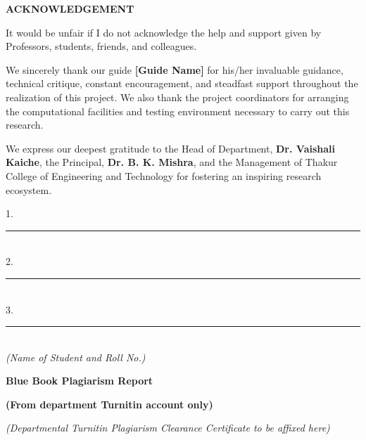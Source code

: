 \documentclass[12pt,a4paper]{report}
\begin{document}
\newpage
\thispagestyle{empty}
\begin{center}
{\fontsize{16}{20}\selectfont \textbf{ACKNOWLEDGEMENT}\par}
\end{center}

\vspace{0.8cm}
\noindent It would be unfair if I do not acknowledge the help and support given by Professors, students, friends, and colleagues.

\noindent We sincerely thank our guide \textbf{[Guide Name]} for his/her invaluable guidance, technical critique, constant encouragement, and steadfast support throughout the realization of this project. We also thank the project coordinators for arranging the computational facilities and testing environment necessary to carry out this research.

\noindent We express our deepest gratitude to the Head of Department, \textbf{Dr. Vaishali Kaiche}, the Principal, \textbf{Dr. B. K. Mishra}, and the Management of Thakur College of Engineering and Technology for fostering an inspiring research ecosystem.

\vspace{2.5cm}

\noindent
\begin{flushright}
1. \rule{6cm}{0.4pt}\\
2. \rule{6cm}{0.4pt}\\
3. \rule{6cm}{0.4pt}\\
\textit{(Name of Student and Roll No.)}
\end{flushright}

\newpage
\thispagestyle{empty}
\begin{center}
{\fontsize{16}{20}\selectfont \textbf{Blue Book Plagiarism Report}\par}
{\fontsize{14}{18}\selectfont \textbf{(From department Turnitin account only)}\par}
\end{center}

\vspace{4.0cm}
\begin{center}
\textit{(Departmental Turnitin Plagiarism Clearance Certificate to be affixed here)}
\end{center}
\end{document}
